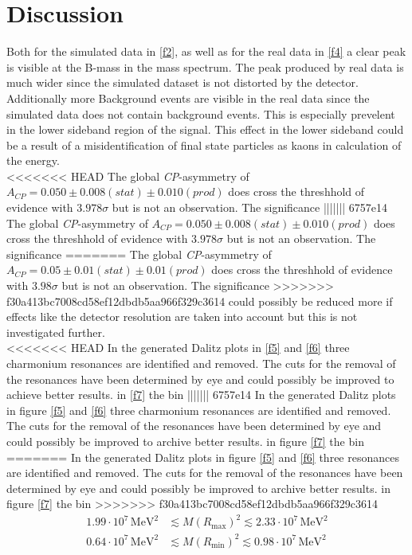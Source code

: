 \section{Discussion}
\label{sec:Diskussion}
Both for the simulated data in \autoref{f2}, as well as for the real data in \autoref{f4} a clear peak is visible at the B-mass in the
mass spectrum. The peak produced by real data is much wider since the simulated dataset is not distorted by the detector. Additionally
more Background events are visible in the real data since the simulated data does not contain background events. This is especially
prevelent in the lower sideband region of the signal. This effect in the lower sideband could be a result of a misidentification of final state
particles as kaons in calculation of the energy. \\
<<<<<<< HEAD
The global \textit{CP}-asymmetry of $A_\textit{CP} = 0.050 \pm 0.008 (stat) \pm 0.010 (prod)$ does cross the threshhold of evidence with $3.978 \sigma$
but is not an observation. The significance
||||||| 6757e14
The global \textit{CP}-asymmetry of $A_\textit{CP} = 0.050 \pm 0.008 (stat) \pm 0.010 (prod)$ does cross the threshhold of evidence with $3.978 \sigma$ 
but is not an observation. The significance 
=======
The global \textit{CP}-asymmetry of $A_\textit{CP} = 0.05 \pm 0.01 (stat) \pm 0.01 (prod)$ does cross the threshhold of evidence with $3.98 \sigma$ 
but is not an observation. The significance 
>>>>>>> f30a413bc7008cd58ef12dbdb5aa966f329c3614
could possibly be reduced more if effects like the detector resolution are taken into account but this is not investigated further. \\
<<<<<<< HEAD
In the generated Dalitz plots in \autoref{f5} and \ref{f6} three charmonium resonances are identified and removed. The cuts for the
removal of the resonances have been determined by eye and could possibly be improved to achieve better results.
in \autoref{f7} the bin
||||||| 6757e14
In the generated Dalitz plots in figure \ref{f5} and \ref{f6} three charmonium resonances are identified and removed. The cuts for the 
removal of the resonances have been determined by eye and could possibly be improved to archive better results. 
in figure \ref{f7} the bin 
=======
In the generated Dalitz plots in figure \ref{f5} and \ref{f6} three resonances are identified and removed. The cuts for the 
removal of the resonances have been determined by eye and could possibly be improved to archive better results. 
in figure \ref{f7} the bin 
>>>>>>> f30a413bc7008cd58ef12dbdb5aa966f329c3614
\begin{align*}
    1.99 \cdot 10^{7} \, \si{\mega\eV\squared} &\lesssim M(R_\text{max})^2 \lesssim 2.33 \cdot 10^{7} \, \si{\mega\eV\squared} \\
    0.64 \cdot 10^{7} \, \si{\mega\eV\squared} &\lesssim M(R_\text{min})^2 \lesssim 0.98 \cdot 10^{7} \, \si{\mega\eV\squared}
\end{align*}
